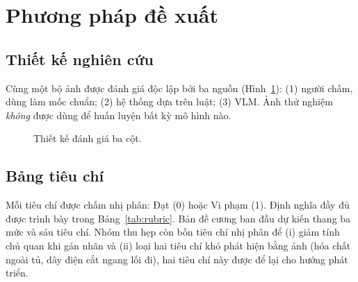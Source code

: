 \documentclass[conference]{IEEEtran}
\begin{document}
\section{Phương pháp đề xuất}

\subsection{Thiết kế nghiên cứu}
Cùng một bộ ảnh được đánh giá độc lập bởi ba nguồn (Hình~\ref{fig:design}): (1) người chấm, dùng làm mốc chuẩn; (2) hệ thống dựa trên luật; (3) VLM. Ảnh thử nghiệm \emph{không} được dùng để huấn luyện bất kỳ mô hình nào.

\begin{figure}[t]
\centering
{}
\caption{Thiết kế đánh giá ba cột.}
\label{fig:design}
\end{figure}

\subsection{Bảng tiêu chí}
Mỗi tiêu chí được chấm nhị phân: Đạt (0) hoặc Vi phạm (1). Định nghĩa đầy đủ được trình bày trong Bảng~\ref{tab:rubric}. Bản đề cương ban đầu dự kiến thang ba mức và sáu tiêu chí. Nhóm thu hẹp còn bốn tiêu chí nhị phân để (i) giảm tính chủ quan khi gán nhãn và (ii) loại hai tiêu chí khó phát hiện bằng ảnh (hóa chất ngoài tủ, dây điện cắt ngang lối đi), hai tiêu chí này được để lại cho hướng phát triển.
\end{document}
